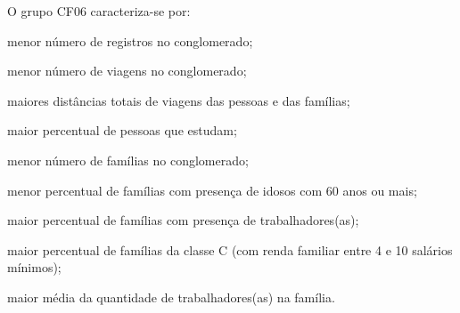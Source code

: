 O grupo CF06 caracteriza-se por:
\begin{compactitem}
\item menor número de registros no conglomerado;
\item menor número de viagens no conglomerado;
\item maiores distâncias totais de viagens das pessoas e das famílias;

\item maior percentual de pessoas que estudam;

\item menor número de famílias no conglomerado;
\item menor percentual de famílias com presença de idosos com 60 anos ou mais;
\item maior percentual de famílias com presença de trabalhadores(as);
\item maior percentual de famílias da classe C (com renda familiar entre 4 e 10 salários mínimos);
\item maior média da quantidade de trabalhadores(as) na família.
\end{compactitem}

